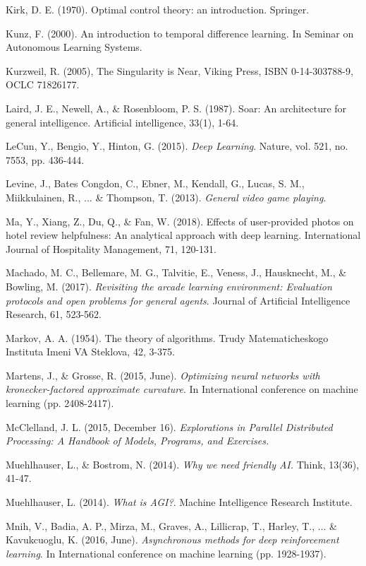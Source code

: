 \begin{thebibliography}{99}
\bibitem{} Kirk, D. E. (1970). Optimal control theory: an introduction. Springer.

\bibitem{} Kunz, F. (2000). An introduction to temporal difference learning. In Seminar on Autonomous Learning Systems.

\bibitem{} Kurzweil, R. (2005), The Singularity is Near, Viking Press, ISBN 0-14-303788-9, OCLC 71826177.

\bibitem{} Laird, J. E., Newell, A., \& Rosenbloom, P. S. (1987). Soar: An architecture for general intelligence. Artificial intelligence, 33(1), 1-64.

\bibitem{} LeCun, Y., Bengio, Y., Hinton, G. (2015). \textit{Deep Learning}. Nature, vol. 521, no. 7553, pp. 436-444.

\bibitem{} Levine, J., Bates Congdon, C., Ebner, M., Kendall, G., Lucas, S. M., Miikkulainen, R., ... \& Thompson, T. (2013). \textit{General video game playing}.

\bibitem{} Ma, Y., Xiang, Z., Du, Q., \& Fan, W. (2018). Effects of user-provided photos on hotel review
helpfulness: An analytical approach with deep learning. International Journal of Hospitality Management, 71, 120-131.

\bibitem{} Machado, M. C., Bellemare, M. G., Talvitie, E., Veness, J., Hausknecht, M., \& Bowling, M.
(2017). \textit{Revisiting the arcade learning environment: Evaluation protocols and open problems for general agents}. Journal of Artificial Intelligence Research, 61, 523-562.

\bibitem{} Markov, A. A. (1954). The theory of algorithms. Trudy Matematicheskogo Instituta Imeni VA Steklova, 42, 3-375.

\bibitem{} Martens, J., \& Grosse, R. (2015, June). \textit{Optimizing neural networks with kronecker-factored approximate curvature}. In International conference on machine learning (pp. 2408-2417).

\bibitem{} McClelland, J. L. (2015, December 16).\textit{ Explorations in Parallel Distributed Processing: A
Handbook of Models, Programs, and Exercises.}

\bibitem{} Muehlhauser, L., \& Bostrom, N. (2014).\textit{ Why we need friendly AI.} Think, 13(36), 41-47.

\bibitem{} Muehlhauser, L. (2014). \textit{What is AGI?}. Machine Intelligence Research Institute. 

\bibitem{} Mnih, V., Badia, A. P., Mirza, M., Graves, A., Lillicrap, T., Harley, T., ... \& Kavukcuoglu, K.
(2016, June). \textit{Asynchronous methods for deep reinforcement learning}. In International conference on machine learning (pp. 1928-1937).


\end{thebibliography}

